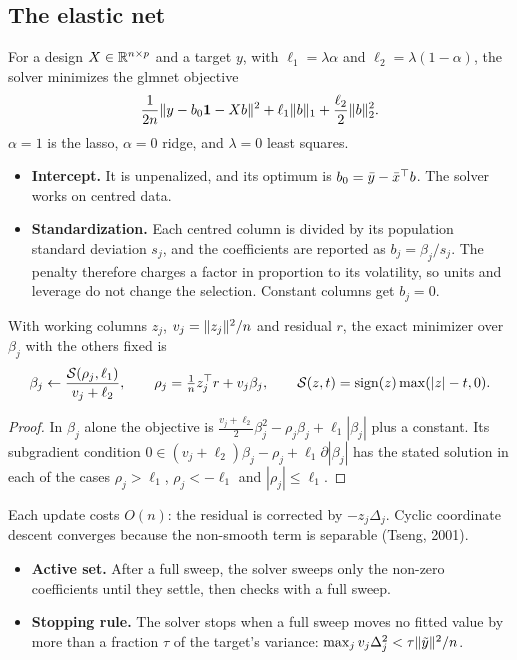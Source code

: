 \documentclass[11pt,a4paper]{article}
\newcommand{\sth}{\mathcal{S}}  %
\begin{document}
\subsection{The elastic net}
For a design $X\in\mathbb{R}^{n\times p}$ and a target $y$, with $\ell_1=\lambda\alpha$ and
$\ell_2=\lambda(1-\alpha)$, the solver minimizes the glmnet objective
\[
  \frac1{2n}\lVert y-b_0\mathbf 1-Xb\rVert^2+\ell_1\lVert b\rVert_1+\frac{\ell_2}2\lVert b\rVert_2^2 .
\]
$\alpha=1$ is the lasso, $\alpha=0$ ridge, and $\lambda=0$ least squares.
\begin{itemize}
  \item \textbf{Intercept.} It is unpenalized, and its optimum is $b_0=\bar y-\bar x^\top b$.
        The solver works on centred data.
  \item \textbf{Standardization.} Each centred column is divided by its population
        standard deviation $s_j$, and the coefficients are reported as $b_j=\beta_j/s_j$.
        The penalty therefore charges a factor in proportion to its volatility, so units and
        leverage do not change the selection. Constant columns get $b_j=0$.
\end{itemize}

\begin{proposition}
With working columns $z_j$, $v_j=\lVert z_j\rVert^2/n$ and residual $r$, the exact minimizer over
$\beta_j$ with the others fixed is
\[
  \beta_j\leftarrow\frac{\sth(\rho_j,\ell_1)}{v_j+\ell_2},\qquad
  \rho_j=\tfrac1nz_j^\T r+v_j\beta_j,\qquad
  \sth(z,t)=\operatorname{sign}(z)\max(|z|-t,0).
\]
\end{proposition}
\begin{proof}
In $\beta_j$ alone the objective is $\frac{v_j+\ell_2}2\beta_j^2-\rho_j\beta_j+\ell_1|\beta_j|$
plus a constant. Its subgradient condition $0\in(v_j+\ell_2)\beta_j-\rho_j+\ell_1\partial|\beta_j|$
has the stated solution in each of the cases $\rho_j>\ell_1$, $\rho_j<-\ell_1$ and
$|\rho_j|\le\ell_1$.
\end{proof}
Each update costs $O(n)$: the residual is corrected by $-z_j\Delta_j$. Cyclic coordinate
descent converges because the non-smooth term is separable (Tseng, 2001).
\begin{itemize}
  \item \textbf{Active set.} After a full sweep, the solver sweeps only the non-zero
        coefficients until they settle, then checks with a full sweep.
  \item \textbf{Stopping rule.} The solver stops when a full sweep moves no fitted value by
        more than a fraction $\tau$ of the target's variance:
        $\max_jv_j\Delta_j^2<\tau\lVert \tilde y\rVert^2/n$.
\end{itemize}
\end{document}
